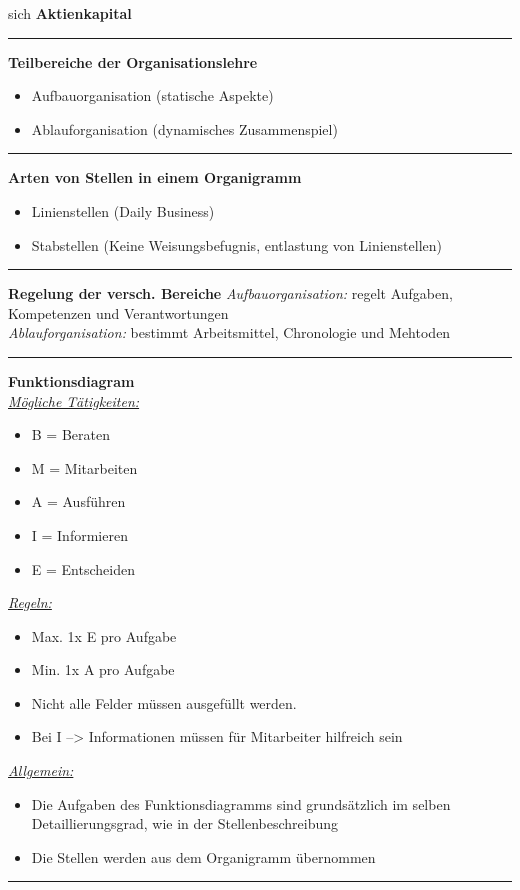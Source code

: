 \documentclass{article} %
\begin{document}
\begin{minipage}[t][0.8\textheight]{0.97\textwidth}
\begin{multicols*}{4}
\begin{flushleft}
{			sich \textbf{Aktienkapital}
			\noindent\rule{\linewidth}{0.4pt}
			\textbf{Teilbereiche der Organisationslehre}
			 \begin{itemize}
				 \item Aufbauorganisation (statische Aspekte)
				 \item Ablauforganisation (dynamisches Zusammenspiel)
			 \end{itemize}
			\noindent\rule{\linewidth}{0.4pt}
			\textbf{Arten von Stellen in einem Organigramm}
			\begin{itemize}
				\item Linienstellen (Daily Business)
				\item Stabstellen (Keine Weisungsbefugnis, entlastung von Linienstellen)
			\end{itemize}
			\noindent\rule{\linewidth}{0.4pt}
			\textbf{Regelung der versch. Bereiche}
			\textit{Aufbauorganisation:} regelt Aufgaben, Kompetenzen
			und Verantwortungen\\
			\textit{Ablauforganisation:} bestimmt Arbeitsmittel,
			Chronologie und Mehtoden
			\noindent\rule{\linewidth}{0.4pt}
			\textbf{Funktionsdiagram}\\
			\underline{\textit{Mögliche Tätigkeiten:}}
			\begin{itemize}
				\item B = Beraten
				\item M = Mitarbeiten
				\item A = Ausführen
				\item I = Informieren
				\item E = Entscheiden
			\end{itemize}
			\underline{\textit{Regeln:}}
			\begin{itemize}
				\item Max. 1x E pro Aufgabe
				\item Min. 1x A pro Aufgabe
				\item Nicht alle Felder müssen ausgefüllt werden.
				\item Bei I --> Informationen müssen für Mitarbeiter hilfreich sein
			\end{itemize}
			\underline{\textit{Allgemein:}}
			\begin{itemize}
				\item Die Aufgaben des Funktionsdiagramms sind
					grundsätzlich im selben Detaillierungsgrad, wie in der
					Stellenbeschreibung
				\item Die Stellen werden aus dem Organigramm übernommen
			\end{itemize}
			\noindent\rule{\linewidth}{0.4pt}
		}
		\end{flushleft}
	\end{multicols*}
	\end{minipage}
\end{document}
